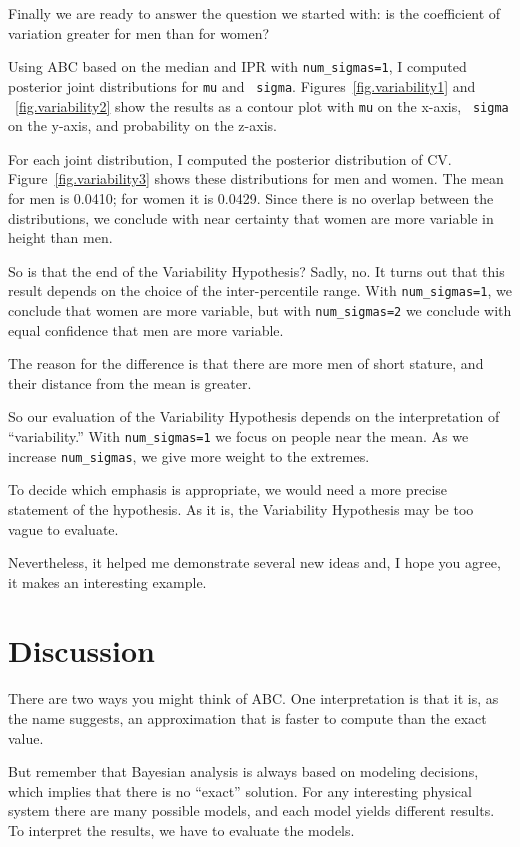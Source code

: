 \documentclass[12pt]{book}
\begin{document}
Finally we are ready to answer the question we started with: is the
coefficient of variation greater for men than for women?

Using ABC based on the median and IPR with \verb"num_sigmas=1", I
computed posterior joint distributions for {\tt mu} and {\tt
  sigma}.  Figures~\ref{fig.variability1} and ~\ref{fig.variability2}
show the results as a contour plot with {\tt mu} on the x-axis, {\tt
  sigma} on the y-axis, and probability on the z-axis.

For each joint distribution, I computed the posterior distribution of
CV.  Figure~\ref{fig.variability3} shows these distributions for men
and women.  The mean for men is 0.0410; for women it is 0.0429.
Since there is no overlap between the distributions, we conclude with
near certainty that
women are more variable in height than men.

So is that the end of the Variability Hypothesis?  Sadly, no.  It turns
out that this
result depends on the choice of the
inter-percentile range.  With \verb"num_sigmas=1", we conclude that
women are more variable, but with \verb"num_sigmas=2" we conclude
with equal confidence that men are more variable.

The reason for the difference is that there
are more men of short stature, and their distance from the mean is
greater.

So our evaluation of the Variability Hypothesis depends on the
interpretation of ``variability.''  With \verb"num_sigmas=1" we
focus on people near the mean.  As we increase
\verb"num_sigmas", we give more weight to the extremes.  

To decide which
emphasis is appropriate, we would need a more precise statement
of the hypothesis.  As it is, the Variability Hypothesis may be
too vague to evaluate.

Nevertheless, it helped
me demonstrate several new ideas and, I hope you agree,
it makes an interesting example.


\section{Discussion}

There are two ways you might think of ABC.  One interpretation
is that it is, as the name suggests, an approximation that is
faster to compute than the exact value.

But remember that Bayesian analysis is always
based on modeling decisions, which implies that there is no
``exact'' solution.  For any interesting
physical system there are many possible models, and each model
yields different results.  To interpret the results, we have to
evaluate the models.
\end{document}
